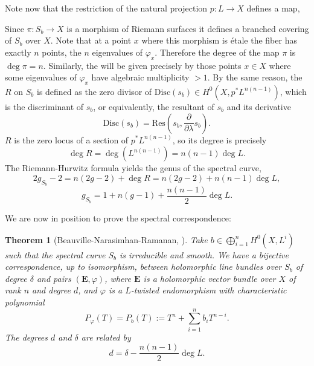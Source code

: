\documentclass[12pt,a4paper]{book}
\newtheorem{thm}{Theorem}[section]
\theoremstyle{definition} \newtheorem{defn}[thm]{Definition}
\theoremstyle{definition} \newtheorem{ejemplo}[thm]{Example}
\theoremstyle{remark} \newtheorem{rem}[thm]{Remark}
\def\Disc{\mathrm{Disc}}
\def\Res{\mathrm{Res}}
\newcommand{\ve}[1]{\mathbf{#1}}
\let\emph\relax
\begin{document}
       Note now that the restriction of the natural projection $p:L\rightarrow X$ defines a map,
       \begin{center}
	\end{center}
	Since $\pi:S_b\rightarrow X$ is a morphism of Riemann surfaces it defines a branched covering of $S_b$ over $X$. Note that at a point $x$ where this morphism is étale the fiber has exactly $n$ points, the $n$ eigenvalues of $\varphi_x$. Therefore the degree of the map $\pi$ is $\deg \pi = n$. Similarly, the \emph{branch locus} will be given precisely by those points $x\in X$ where some eigenvalues of $\varphi_x$ have algebraic multiplicity $>1$. By the same reason, the \emph{ramification divisor} $R$ on $S_b$ is defined as the zero divisor of $\Disc(s_b)\in H^0(X,p^*L^{n(n-1)})$, which is the discriminant of $s_b$, or equivalently, the resultant of $s_b$ and its derivative
	\begin{equation*}
	  \Disc(s_b)=\Res\left(s_b, \frac{\partial}{\partial \lambda} s_b\right).
	\end{equation*}
	$R$ is the zero locus of a section of $p^*L^{n(n-1)}$, so its degree is precisely
	\begin{equation*}
	  \deg R = \deg (L^{n(n-1)})=n(n-1)\deg L.
	\end{equation*}
	The Riemann-Hurwitz formula yields the genus of the spectral curve,
	\begin{equation*}
	  2g_{S_b} - 2 = n(2g-2) + \deg R = n(2g-2) + n(n-1)\deg L,
	\end{equation*}
	\begin{equation*}
	  g_{S_b}= 1+n(g-1)+ \frac{n(n-1)}{2}\deg L.
	\end{equation*}

	We are now in position to prove the spectral correspondence:
	\begin{thm}[Beauville-Narasimhan-Ramanan, \cite{bnr}]
	  Take $b \in \bigoplus_{i=1}^n H^0(X,L^i)$ such that the spectral curve $S_b$ is irreducible and smooth. We have a bijective correspondence, up to isomorphism, between holomorphic line bundles over $S_b$ of degree $\delta$ and pairs $(\ve{E},\varphi)$, where $\ve{E}$ is a holomorphic vector bundle over $X$ of rank $n$ and degree $d$, and $\varphi$ is a $L$-twisted endomorphism with characteristic polynomial
	  \begin{equation*}
	    P_\varphi(T)=P_b(T):=T^n + \sum_{i=1}^n b_i T^{n-i}.   
	  \end{equation*}
	  The degrees $d$ and $\delta$ are related by
	  \begin{equation*}
	    d=\delta - \frac{n(n-1)}{2}\deg L .
	  \end{equation*}
	\end{thm}
\end{document}

